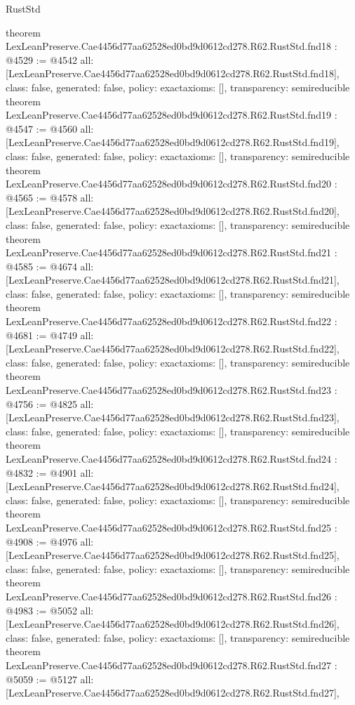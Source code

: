 \begin{lexlean}{RustStd}
\begin{coremodule}
{}
theorem LexLeanPreserve.Cae4456d77aa62528ed0bd9d0612cd278.R62.RustStd.fnd18 : @4529 := @4542 {
  all: [LexLeanPreserve.Cae4456d77aa62528ed0bd9d0612cd278.R62.RustStd.fnd18],
  class: false,
  generated: false,
  policy: exact{axioms: []},
  transparency: semireducible
}
theorem LexLeanPreserve.Cae4456d77aa62528ed0bd9d0612cd278.R62.RustStd.fnd19 : @4547 := @4560 {
  all: [LexLeanPreserve.Cae4456d77aa62528ed0bd9d0612cd278.R62.RustStd.fnd19],
  class: false,
  generated: false,
  policy: exact{axioms: []},
  transparency: semireducible
}
theorem LexLeanPreserve.Cae4456d77aa62528ed0bd9d0612cd278.R62.RustStd.fnd20 : @4565 := @4578 {
  all: [LexLeanPreserve.Cae4456d77aa62528ed0bd9d0612cd278.R62.RustStd.fnd20],
  class: false,
  generated: false,
  policy: exact{axioms: []},
  transparency: semireducible
}
theorem LexLeanPreserve.Cae4456d77aa62528ed0bd9d0612cd278.R62.RustStd.fnd21 : @4585 := @4674 {
  all: [LexLeanPreserve.Cae4456d77aa62528ed0bd9d0612cd278.R62.RustStd.fnd21],
  class: false,
  generated: false,
  policy: exact{axioms: []},
  transparency: semireducible
}
theorem LexLeanPreserve.Cae4456d77aa62528ed0bd9d0612cd278.R62.RustStd.fnd22 : @4681 := @4749 {
  all: [LexLeanPreserve.Cae4456d77aa62528ed0bd9d0612cd278.R62.RustStd.fnd22],
  class: false,
  generated: false,
  policy: exact{axioms: []},
  transparency: semireducible
}
theorem LexLeanPreserve.Cae4456d77aa62528ed0bd9d0612cd278.R62.RustStd.fnd23 : @4756 := @4825 {
  all: [LexLeanPreserve.Cae4456d77aa62528ed0bd9d0612cd278.R62.RustStd.fnd23],
  class: false,
  generated: false,
  policy: exact{axioms: []},
  transparency: semireducible
}
theorem LexLeanPreserve.Cae4456d77aa62528ed0bd9d0612cd278.R62.RustStd.fnd24 : @4832 := @4901 {
  all: [LexLeanPreserve.Cae4456d77aa62528ed0bd9d0612cd278.R62.RustStd.fnd24],
  class: false,
  generated: false,
  policy: exact{axioms: []},
  transparency: semireducible
}
theorem LexLeanPreserve.Cae4456d77aa62528ed0bd9d0612cd278.R62.RustStd.fnd25 : @4908 := @4976 {
  all: [LexLeanPreserve.Cae4456d77aa62528ed0bd9d0612cd278.R62.RustStd.fnd25],
  class: false,
  generated: false,
  policy: exact{axioms: []},
  transparency: semireducible
}
theorem LexLeanPreserve.Cae4456d77aa62528ed0bd9d0612cd278.R62.RustStd.fnd26 : @4983 := @5052 {
  all: [LexLeanPreserve.Cae4456d77aa62528ed0bd9d0612cd278.R62.RustStd.fnd26],
  class: false,
  generated: false,
  policy: exact{axioms: []},
  transparency: semireducible
}
theorem LexLeanPreserve.Cae4456d77aa62528ed0bd9d0612cd278.R62.RustStd.fnd27 : @5059 := @5127 {
  all: [LexLeanPreserve.Cae4456d77aa62528ed0bd9d0612cd278.R62.RustStd.fnd27],
}
\end{coremodule}
\end{lexlean}

